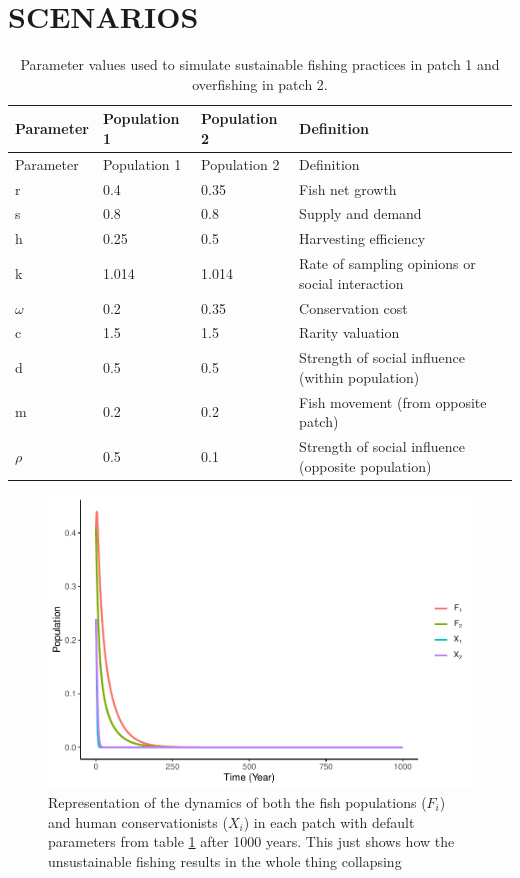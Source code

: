 \documentclass[
]{article}
\begin{document}
\hypertarget{scenarios}{%
\section{SCENARIOS}\label{scenarios}}



\begin{longtable}[]{@{}llll@{}}
\caption{\label{tab:DispersionParamTable}Parameter values used to simulate sustainable fishing practices in patch 1 and overfishing in patch 2. \label{DispersionParamTable}}\tabularnewline
\toprule\noalign{}
Parameter & Population 1 & Population 2 & Definition \\
\midrule\noalign{}
\endfirsthead
\toprule\noalign{}
Parameter & Population 1 & Population 2 & Definition \\
\midrule\noalign{}
\endhead
\bottomrule\noalign{}
\endlastfoot
r & 0.4 & 0.35 & Fish net growth \\
s & 0.8 & 0.8 & Supply and demand \\
h & 0.25 & 0.5 & Harvesting efficiency \\
k & 1.014 & 1.014 & Rate of sampling opinions or social interaction \\
\(\omega\) & 0.2 & 0.35 & Conservation cost \\
c & 1.5 & 1.5 & Rarity valuation \\
d & 0.5 & 0.5 & Strength of social influence (within population) \\
m & 0.2 & 0.2 & Fish movement (from opposite patch) \\
\(\rho\) & 0.5 & 0.1 & Strength of social influence (opposite population) \\
\end{longtable}



\begin{figure}
\centering
\includegraphics{SubmissionFigs_files/figure-latex/DispersionScenario-1.pdf}
\caption{\label{fig:DispersionScenario}Representation of the dynamics of both the fish populations (\(F_i\)) and human conservationists (\(X_i\)) in each patch with default parameters from table \ref{DispersionParamTable} after 1000 years. This just shows how the unsustainable fishing results in the whole thing collapsing \label{DispersionScenario}}
\end{figure}
\end{document}
